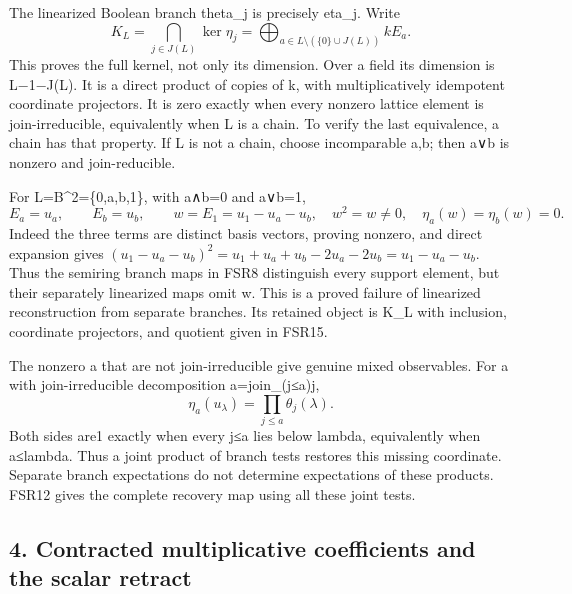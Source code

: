 \documentclass[
  10pt,
  a4paper,
]{article}
\begin{document}
The linearized Boolean branch theta\_j is precisely eta\_j. Write \[
K_L=\bigcap_{j\in J(L)}\ker\eta_j
=\bigoplus_{a\in L\setminus(\{0\}\cup J(L))}kE_a.
\tag{FSR15}
\] This proves the full kernel, not only its dimension. Over a field its
dimension is \textbar L\textbar−1−\textbar J(L)\textbar. It is a direct
product of copies of k, with multiplicatively idempotent coordinate
projectors. It is zero exactly when every nonzero lattice element is
join-irreducible, equivalently when L is a chain. To verify the last
equivalence, a chain has that property. If L is not a chain, choose
incomparable a,b; then a∨b is nonzero and join-reducible.

For L=B\^{}2=\{0,a,b,1\}, with a∧b=0 and a∨b=1, \[
E_a=u_a,\qquad E_b=u_b,\qquad
w=E_1=u_1-u_a-u_b,
\quad w^2=w\neq0,
\quad\eta_a(w)=\eta_b(w)=0.
\tag{FSR16}
\] Indeed the three terms are distinct basis vectors, proving nonzero,
and direct expansion gives
\((u_1-u_a-u_b)^2=u_1+u_a+u_b-2u_a-2u_b=u_1-u_a-u_b\). Thus the semiring
branch maps in FSR8 distinguish every support element, but their
separately linearized maps omit w. This is a proved failure of
linearized reconstruction from separate branches. Its retained object is
K\_L with inclusion, coordinate projectors, and quotient given in FSR15.

The nonzero a that are not join-irreducible give genuine mixed
observables. For a with join-irreducible decomposition a=join\_(j≤a)j,
\[
\eta_a(u_\lambda)=\prod_{j\leq a}\theta_j(\lambda).
\tag{FSR17}
\] Both sides are1 exactly when every j≤a lies below lambda,
equivalently when a≤lambda. Thus a joint product of branch tests
restores this missing coordinate. Separate branch expectations do not
determine expectations of these products. FSR12 gives the complete
recovery map using all these joint tests.

\subsection{4. Contracted multiplicative coefficients and the scalar
retract}\label{contracted-multiplicative-coefficients-and-the-scalar-retract}
\end{document}
